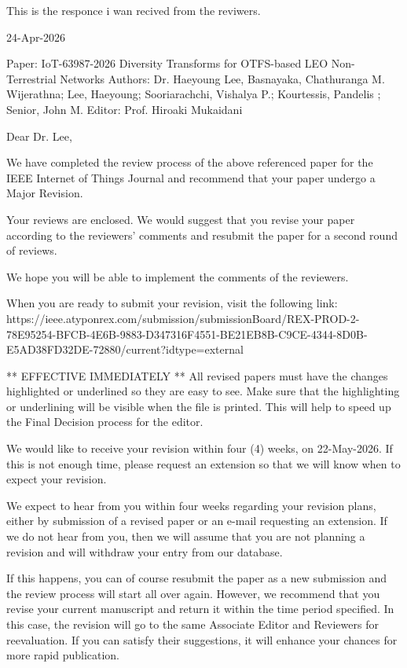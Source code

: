 This is the responce i wan recived from the reviwers.

24-Apr-2026

Paper: IoT-63987-2026 Diversity Transforms for OTFS-based LEO Non-Terrestrial Networks
Authors: Dr. Haeyoung Lee, Basnayaka, Chathuranga M. Wijerathna; Lee, Haeyoung; Sooriarachchi, Vishalya P.; Kourtessis, Pandelis ; Senior, John M.
Editor: Prof. Hiroaki Mukaidani

Dear Dr. Lee,

We have completed the review process of the above referenced paper for the IEEE Internet of Things Journal and recommend that your paper undergo a Major Revision.

Your reviews are enclosed. We would suggest that you revise your paper according to the reviewers' comments and resubmit the paper for a second round of reviews.

We hope you will be able to implement the comments of the reviewers.

When you are ready to submit your revision, visit the following link:
https://ieee.atyponrex.com/submission/submissionBoard/REX-PROD-2-78E95254-BFCB-4E6B-9883-D347316F4551-BE21EB8B-C9CE-4344-8D0B-E5AD38FD32DE-72880/current?idtype=external

** EFFECTIVE IMMEDIATELY ** All revised papers must have the changes highlighted or underlined so they are easy to see.  Make sure that the highlighting or underlining will be visible when the file is printed.  This will help to speed up the Final Decision process for the editor.

We would like to receive your revision within four (4) weeks, on  22-May-2026.  If this is not enough time, please request an extension so that we will know when to expect your revision.  

We expect to hear from you within four weeks regarding your revision plans, either by submission of a revised paper or an e-mail requesting an extension.  If we do not hear from you, then we will assume that you are not planning a revision and will withdraw your entry from our database.

If this happens, you can of course resubmit the paper as a new submission and the review process will start all over again. However, we recommend that you revise your current manuscript and return it within the time period specified.  In this case, the revision will go to the same Associate Editor and Reviewers for reevaluation.  If you can satisfy their suggestions, it will enhance your chances for more rapid publication.

